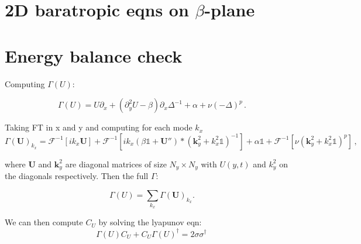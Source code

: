 \documentclass[12pt]{amsart}
\begin{document}
\section{2D baratropic eqns on $\beta$-plane}

\section{Energy balance check}

Computing $\Gamma(U)$:

\begin{equation*}
  \Gamma(U) = U\partial_x +(\partial_y^2 U-\beta)\partial_x \Delta^{-1} + \alpha + \nu(-\Delta)^p\,.
\end{equation*}

Taking FT in x and y and computing for each mode $k_{x}$
\begin{equation*}
  \Gamma(\mathbf{U})_{k_{x}} = \mathcal F^{-1}[ik_{x}\mathbf{U}] + \mathcal F^{-1}[ik_{x}(\beta\mathbb{1} + \mathbf{U}'')* (\mathbf{k}_{y}^{2}  +k_{x}^{2} \mathbb{1}) ^{-1}] + \alpha \mathbb{1} + \mathcal F^{-1}[\nu(\mathbf{k}_{y}^{2} + k_{x}^{2}\mathbb{1})^p]\,,
\end{equation*}

where $\mathbf{U}$ and $\mathbf{k}_{y}^{2}$ are diagonal matrices of size $ N_{y} \times N_{y}$ with $U(y,t)$ and $k_{y}^2$ on the diagonals respectively. Then the full $\Gamma$:

\begin{equation*}
  \Gamma(U) = \sum_{k_{x}} \Gamma(\mathbf{U})_{k_{x}} .
\end{equation*}

We can then compute $C_{U}$ by solving the lyapunov eqn:
\begin{equation*}
  \Gamma(U) C_{U} + C_{U} \Gamma(U)^\dagger = 2
  \sigma \sigma^\dagger\,
\end{equation*}
\end{document}
